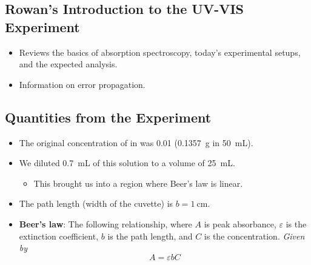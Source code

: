 \documentclass[../notes.tex]{subfiles}
\begin{document}
\subsection*{Rowan's Introduction to the UV-VIS Experiment}
\begin{itemize}
    \item Reviews the basics of absorption spectroscopy, today's experimental setups, and the expected analysis.
    \item Information on error propagation.
\end{itemize}


\subsection*{Quantities from the Experiment}
\begin{itemize}
    \item The original concentration of  in  was \SI{0.01}{\molar} (\SI{0.1357}{\gram} in \SI{50}{\milli\liter}).
    \item We diluted \SI{0.7}{\milli\liter} of this solution to a volume of \SI{25}{\milli\liter}.
    \begin{itemize}
        \item This brought us into a region where Beer's law is linear.
    \end{itemize}
    \item The path length (width of the cuvette) is $b=\SI{1}{\centi\meter}$.
    \item \textbf{Beer's law}: The following relationship, where $A$ is peak absorbance, $\varepsilon$ is the extinction coefficient, $b$ is the path length, and $C$ is the concentration. \emph{Given by}
    \begin{equation*}
        A = \varepsilon bC
    \end{equation*}
\end{itemize}
\end{document}
